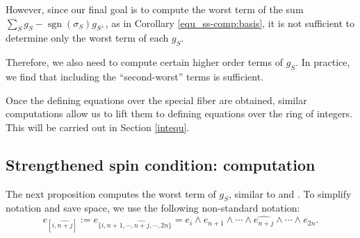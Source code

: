 \documentclass[pdflatex,sn-mathphys-num]{sn-jnl}%
\theoremstyle{thmstyleone}%
\theoremstyle{thmstyletwo}%
\numberwithin{equation}{subsection}
\theoremstyle{thmstylethree}%
\DeclareMathOperator{\sgn}{sgn}
\newcommand{\wh}{\widehat}
\begin{document}
However, since our final goal is to compute the worst term of the sum $\sum_S g_S-\sgn(\sigma_S)g_{S^\perp}$, as in Corollary \ref{equ_ss-comp:basis}, it is not sufficient to determine only the worst term of each $g_S$.

Therefore, we also need to compute certain higher order terms of $g_S$.
In practice, we find that including the ``second-worst'' terms is sufficient.

Once the defining equations over the special fiber are obtained, similar computations allow us to lift them to defining equations over the ring of integers. This will be carried out in Section \ref{intequ}.		
		
		
\subsection{Strengthened spin condition: computation}\label{equ_ss-comp}
The next proposition computes the worst term of $g_S$, similar to \cite[Lemma 4.9]{Smithling2015} and \cite[Lemma 1]{Yu2019}.
To simplify notation and save space, we use the following non-standard notation:
\begin{equation}\label{equ_ss-comp:not}
    e_{[i,\wh{n+j}]}:=e_{\{i,n+1,\cdots,\wh{n+j},\cdots,2n\}}=e_i\wedge e_{n+1}\wedge\cdots\wedge\wh{e_{n+j}}\wedge\cdots \wedge e_{2n}.
\end{equation}
\end{document}
